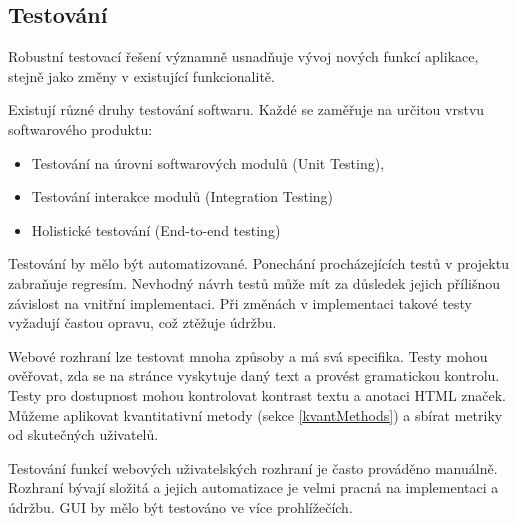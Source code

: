 \subsection{Testování}

Robustní testovací řešení významně usnadňuje vývoj nových funkcí aplikace, stejně jako změny v existující funkcionalitě.

Existují různé druhy testování softwaru.
Každé se zaměřuje na určitou vrstvu softwarového produktu:
\begin{itemize}
    \item Testování na úrovni softwarových modulů (Unit Testing),
    \item Testování interakce modulů (Integration Testing) 
    \item Holistické testování (End-to-end testing)
\end{itemize}

Testování by mělo být automatizované.
Ponechání procházejících testů v projektu zabraňuje regresím.
Nevhodný návrh testů může mít za důsledek jejich přílišnou závislost na vnitřní implementaci.
Při změnách v implementaci takové testy vyžadují častou opravu, což ztěžuje údržbu.

Webové rozhraní lze testovat mnoha způsoby a má svá specifika.
Testy mohou ověřovat, zda se na stránce vyskytuje daný text a provést gramatickou kontrolu.
Testy pro dostupnost mohou kontrolovat kontrast textu a anotaci HTML značek.
Můžeme aplikovat kvantitativní metody (sekce \ref{kvantMethods}) a sbírat metriky od skutečných uživatelů.

Testování funkcí webových uživatelských rozhraní je často prováděno manuálně.
Rozhraní bývají složitá a jejich automatizace je velmi pracná na implementaci a údržbu. 
GUI by mělo být testováno ve více prohlížečích.
